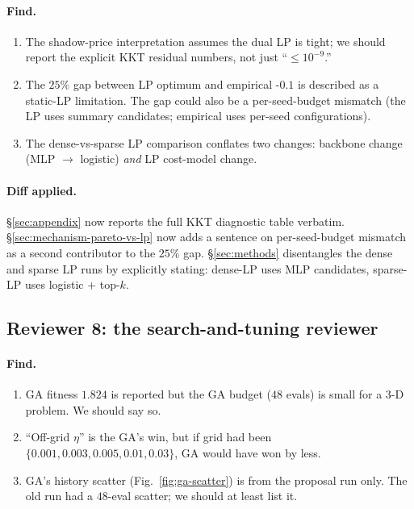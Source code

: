 \paragraph{Find.}
\begin{enumerate}[leftmargin=*,nosep]
    \item The shadow-price interpretation assumes the dual LP is tight; we
        should report the explicit KKT residual numbers, not just ``$\leq
        10^{-9}$.''
    \item The $25\%$ gap between LP optimum and empirical \fedprox{}-$0.1$ is
        described as a static-LP limitation. The gap could also be a
        per-seed-budget mismatch (the LP uses summary candidates; empirical
        uses per-seed configurations).
    \item The dense-vs-sparse LP comparison conflates two changes: backbone
        change (MLP $\to$ logistic) \emph{and} LP cost-model change.
\end{enumerate}
\paragraph{Diff applied.} \S\ref{sec:appendix} now reports the full KKT
diagnostic table verbatim. \S\ref{sec:mechanism-pareto-vs-lp} now adds a
sentence on per-seed-budget mismatch as a second contributor to the $25\%$
gap. \S\ref{sec:methods} disentangles the dense and sparse LP runs by
explicitly stating: dense-LP uses MLP candidates, sparse-LP uses logistic
+ top-$k$.

\subsection{Reviewer 8: the search-and-tuning reviewer}
\paragraph{Find.}
\begin{enumerate}[leftmargin=*,nosep]
    \item GA fitness $1.824$ is reported but the GA budget ($48$ evals) is
        small for a $3$-D problem. We should say so.
    \item ``Off-grid $\eta$'' is the GA's win, but if grid had been
        $\{0.001, 0.003, 0.005, 0.01, 0.03\}$, GA would have won by less.
    \item GA's history scatter (Fig.~\ref{fig:ga-scatter}) is from the proposal
        run only. The old run had a $48$-eval scatter; we should at least
        list it.
\end{enumerate}
